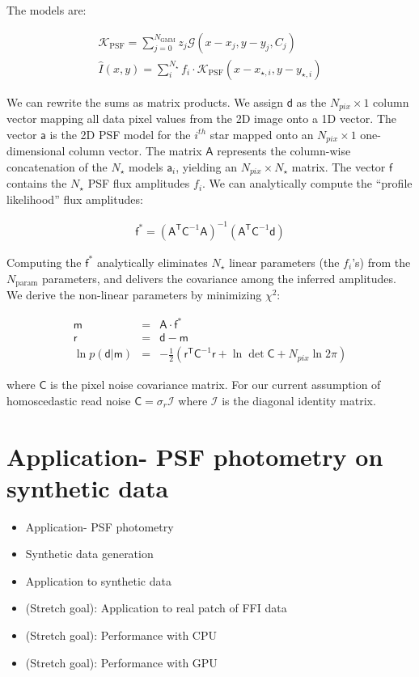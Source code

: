 \documentclass{rnaastex}
\newcommand{\vd}{\mathsf{d}}
\newcommand{\vrr}{\mathsf{r}}
\newcommand{\vm}{\mathsf{m}}
\newcommand{\vC}{\mathsf{C}}
\newcommand{\vA}{\mathsf{A}}
\newcommand{\va}{\mathsf{a}}
\newcommand{\vf}{\mathsf{f}}
\newcommand{\trans}{\mathsf{T}}
\begin{document}
The models are:

\begin{eqnarray}
\mathcal{K}_{\mathrm{PSF}} = \sum_{j=0}^{N_{\mathrm{GMM}}} z_j \mathcal{G}(x-x_j, y-y_j, C_j) \\
\hat I(x,y) = \sum_i^{N_\star} f_i \cdot \mathcal{K}_{\mathrm{PSF}}(x-x_{\star, i}, y-y_{\star, i})
\end{eqnarray}

We can rewrite the sums as matrix products.  We assign $ \vd $ as the $N_{pix} \times 1$ column vector mapping all data pixel values from the 2D image onto a 1D vector.  The vector $ \va $ is the 2D PSF model for the $i^{th}$ star mapped onto an $N_{pix} \times 1$ one-dimensional column vector.  The matrix $\vA$ represents the column-wise concatenation of the $N_{\star}$ models $\va_{i}$, yielding an $N_{pix} \times N_{\star}$ matrix.  The vector $\vf$ contains the $N_{\star}$ PSF flux amplitudes $f_i$.  We can analytically compute the ``profile likelihood'' flux amplitudes:

\begin{eqnarray}
\vf^{*} = (\vA^{\trans} \vC^{-1} \vA)^{-1}(\vA^{\trans} \vC^{-1} \vd)
\end{eqnarray}

Computing the $\vf^{*}$ analytically eliminates $N_\star$ linear parameters (the $f_i$'s) from the $N_{\mathrm{param}}$ parameters, and delivers the covariance among the inferred amplitudes.  We derive the non-linear parameters by minimizing $\chi^2$:

\begin{eqnarray}
\vm &=& \vA \cdot \vf^{*} \\
\vrr &=& \vd - \vm \\
  \ln{p(\vd | \vm)} &=& -\frac{1}{2} \left( \vrr^\trans \vC^{-1} \vrr + \ln{\det{\vC}} + N_{pix} \ln{2\pi} \right)
\end{eqnarray}

where $\vC$ is the pixel noise covariance matrix.  For our current assumption of homoscedastic read noise $\vC = \sigma_r \mathcal{I}$ where $\mathcal{I}$ is the diagonal identity matrix.

\section{Application- PSF photometry on synthetic data}

\begin{itemize}
\item Application- PSF photometry
\item Synthetic data generation
\item Application to synthetic data
\item (Stretch goal): Application to real patch of FFI data
\item (Stretch goal): Performance with CPU
\item (Stretch goal): Performance with GPU
\end{itemize}
\end{document}
